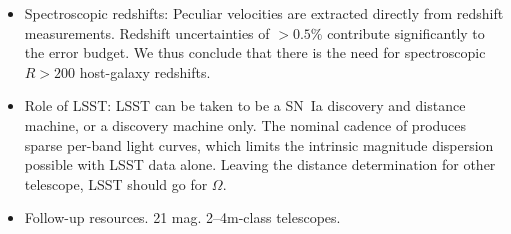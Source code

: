 \documentclass{aastex62}   	%
\begin{document}
\begin{itemize}
\item Spectroscopic redshifts:  Peculiar velocities are extracted directly from redshift measurements.  Redshift uncertainties of $>0.5$\% contribute significantly
to the error budget.  We thus conclude that there is the need for spectroscopic $R>200$ host-galaxy redshifts.
\item Role of LSST:
LSST can be taken to be a SN~Ia discovery and distance machine, or a discovery machine only.   The nominal cadence of 
 produces sparse per-band light curves, which limits the intrinsic magnitude dispersion possible with LSST data alone.  Leaving the
 distance determination for other telescope, LSST should go for $\Omega$.
\item Follow-up resources.  21 mag.  2--4m-class telescopes.
\end{itemize}
\end{document}
